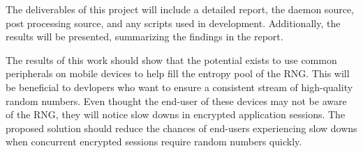 
The deliverables of this project will include a detailed report, the 
daemon source, post processing source, and any scripts used in 
development.  Additionally, the results will be presented, summarizing 
the findings in the report.  

The results of this work should show that the potential exists to use 
common peripherals on mobile devices to help fill the entropy pool of 
the RNG.  This will be beneficial to devlopers who want to ensure a 
consistent stream of high-quality random numbers.  Even thought the 
end-user of these devices may not be aware of the RNG, they will notice 
slow downs in encrypted application sessions.  The proposed solution 
should reduce the chances of end-users experiencing slow downs when 
concurrent encrypted sessions require random numbers quickly.
